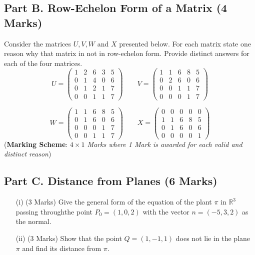 \documentclass[a4paper,12pt]{article}
\begin{document}
\subsection*{Part B. Row-Echelon Form of a Matrix (4 Marks)}
Consider the matrices $U,V,W$ and $X$ presented below. For each matrix state one reason why that matrix in not in row-echelon form. Provide distinct answers for each of the four matrices.
\[
U = \begin{pmatrix}
1&2 & 6  &3 & 5
\\  0&1&4 &0 & 6
\\  0&1&2 &1 & 7
\\  0&0&1 &1 & 7
\end{pmatrix} \qquad  V = \begin{pmatrix}
1&1 & 6  &8 & 5
\\  0&2&6 &0 & 6
\\  0&0&1 &1 & 7
\\  0&0&0 &1 & 7
\end{pmatrix}
\]

\[
W = \begin{pmatrix}
1&1 & 6  &8 & 5
\\  0&1&6 &0 & 6
\\  0&0&0 &1 & 7
\\  0&0&1 &1 & 7
\end{pmatrix} \qquad X = \begin{pmatrix}
0&0&0 &0 & 0\\
1&1 & 6  &8 & 5
\\  0&1&6 &0 & 6
\\  0&0&0 &0 & 1

\end{pmatrix}
\]
\smallskip
\noindent (\textbf{Marking Scheme}: \textit{$4 \times 1$ Marks where 1 Mark is awarded for each valid and distinct reason})




\subsection*{Part C. Distance from Planes (6 Marks)}	

\begin{itemize}
\item[(i)] (3 Marks) Give the general form of the equation of the plant $\pi$ in $\mathbb{R}^3$ passing throughthe point $P_0 =(1,0,2)$ with the vector $n=(-5,3,2)$ as the normal.


\item[(ii)] (3 Marks) Show that the point $Q=(1,-1,1)$ does not lie in the plane $\pi$ and find its distance from $\pi$.
\end{itemize}
\end{document}
